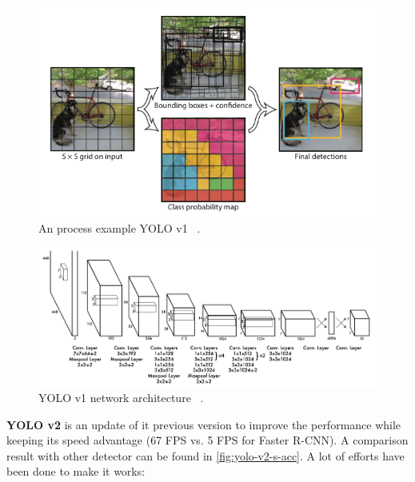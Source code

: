 \begin{figure}
    \includegraphics[width=\linewidth]{figures/yolo_v1_grid_example.png}
    \caption{An process example YOLO v1 ~\protect\cite{yolov1-paper-2015}.}
    \label{fig:yolo-v1-example}
\end{figure}

\begin{figure}
    \includegraphics[width=\linewidth]{figures/yolo_v1_network_architecture.png}
    \caption{YOLO v1 network architecture ~\protect\cite{yolov1-paper-2015}.}
    \label{fig:yolo-network}
\end{figure}

\textbf{YOLO v2} \cite{yolov2-paper-2016} is an update of it
previous version to improve the performance while
keeping its speed advantage (67 FPS vs. 5 FPS for Faster R-CNN).
A comparison result with other detector can be found in 
\autoref{fig:yolo-v2-s-acc}. A lot of efforts have been done to make it works:


